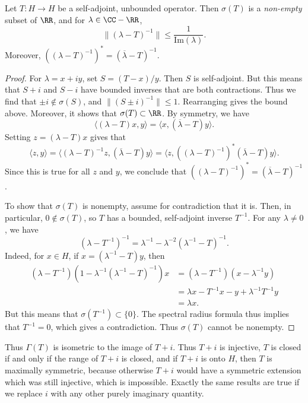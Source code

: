 \begin{theorem}
    Let $T: H \to H$ be a self-adjoint, unbounded operator. Then $\sigma(T)$ is a \emph{non-empty} subset of $\RR$, and for $\lambda \in \CC - \RR$,
    \[ \| (\lambda - T)^{-1} \| \leq \frac{1}{\text{Im}(\lambda)}. \]
    Moreover, $((\lambda - T)^{-1})^* = (\overline{\lambda} - T)^{-1}$.
\end{theorem}
\begin{proof}
    For $\lambda = x + iy$, set $S = (T - x)/y$. Then $S$ is self-adjoint. But this means that $S + i$ and $S - i$ have bounded inverses that are both contractions. Thus we find that $\pm i \not \in \sigma(S)$, and $\| (S \pm i)^{-1} \| \leq 1$. Rearranging gives the bound above. Moreover, it shows that $\sigma(T) \subset \RR$. By symmetry, we have
    \[ \langle (\lambda - T) x, y \rangle = \langle x, (\overline{\lambda} - T) y \rangle. \]
    Setting $z = (\lambda - T) x$ gives that
    \[ \langle z, y \rangle = \langle (\lambda - T)^{-1} z, (\overline{\lambda} - T) y \rangle = \langle z, ((\lambda - T)^{-1})^* (\overline{\lambda} - T) y \rangle. \]
    Since this is true for all $z$ and $y$, we conclude that $((\lambda - T)^{-1})^* = (\overline{\lambda} - T)^{-1}$.

    To show that $\sigma(T)$ is nonempty, assume for contradiction that it is. Then, in particular, $0 \not \in \sigma(T)$, so $T$ has a bounded, self-adjoint inverse $T^{-1}$. For any $\lambda \neq 0$, we have
    \[ (\lambda - T^{-1})^{-1} = \lambda^{-1} - \lambda^{-2} (\lambda^{-1} - T)^{-1}. \]
    Indeed, for $x \in H$, if $x = (\lambda^{-1} - T)y$, then
    \begin{align*}
        (\lambda - T^{-1}) ( 1 - \lambda^{-1} (\lambda^{-1} - T)^{-1} ) x &= (\lambda - T^{-1}) ( x - \lambda^{-1} y )\\
        &= \lambda x - T^{-1} x - y + \lambda^{-1} T^{-1} y\\
        &= \lambda x.
    \end{align*}
    But this means that $\sigma(T^{-1}) \subset \{ 0 \}$. The spectral radius formula thus implies that $T^{-1} = 0$, which gives a contradiction. Thus $\sigma(T)$ cannot be nonempty.
\end{proof}






%
Thus $\Gamma(T)$ is isometric to the image of $T + i$. Thus $T + i$ is injective, $T$ is closed if and only if the range of $T + i$ is closed, and if $T + i$ is onto $H$, then $T$ is maximally symmetric, because otherwise $T + i$ would have a symmetric extension which was still injective, which is impossible. Exactly the same results are true if we replace $i$ with any other purely imaginary quantity.

